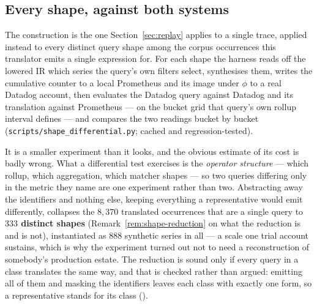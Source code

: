 \iffull\fi
\iffull\fi
\iffull\fi

\iffull\fi
\subsection{Every shape, against both systems}
\label{sec:differential}

The construction is the one Section~\ref{sec:replay} applies to a single trace, applied
instead to every distinct query shape among the corpus occurrences this translator
emits a single expression for. For each shape the harness
reads off the lowered IR which series the query's own filters select, synthesises them,
writes the cumulative counter to a local Prometheus and its image under $\phi$ to a real
Datadog account, then evaluates the Datadog query against Datadog and its translation
against Prometheus --- on the bucket grid that query's own rollup interval defines --- and
compares the two readings bucket by bucket
(\texttt{scripts\slash shape\_differential.py}; cached and regression-tested).


It is a smaller experiment than it looks, and the obvious estimate of its cost is badly
wrong. What a differential test exercises is the \emph{operator structure} --- which
rollup, which aggregation, which matcher shapes --- so two queries differing only in the
metric they name are one experiment rather than two. Abstracting away the identifiers and
nothing else, keeping everything a representative would emit differently, collapses the
$8{,}370$ translated occurrences that are a single query to \textbf{$333$ distinct
shapes} (Remark~\ref{rem:shape-reduction} on what the reduction is and is not),
instantiated as $888$ synthetic series in all --- a scale one trial account
sustains, which is why the experiment turned out not to need a reconstruction of
somebody's production estate. The reduction is sound only if every query in a class
translates the same way, and that is checked rather than argued: emitting all of them and
masking the identifiers leaves each class with exactly one form, so a representative
stands for its class ().

\iffull\fi

